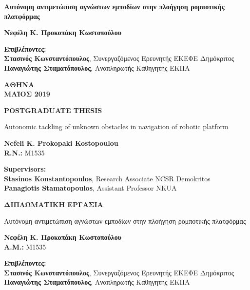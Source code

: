 \begin{center}
	\vspace{1.5cm}
	\Large
	\textbf{Αυτόνομη αντιμετώπιση αγνώστων εμποδίων στην πλοήγηση ρομποτικής πλατφόρμας}
	
	\vspace{1.5cm}
	\normalsize
	\textbf{Νεφέλη Κ. Προκοπάκη Κωστοπούλου}
	
	\vspace{1.5cm}
	\textbf{Επιβλέποντες:}\\
	\textbf{Στασινός Κωνσταντόπουλος}, Συνεργαζόμενος Ερευνητής ΕΚΕΦΕ Δημόκριτος\\
	\textbf{Παναγιώτης Σταματόπουλος}, Αναπληρωτής Καθηγητής ΕΚΠΑ
	
	\vfill
	
	\vspace{0.8cm}
	\textbf{ΑΘΗΝΑ}\\
	\vspace{0.2cm}
	\textbf{ΜΑΪΟΣ 2019}
	\newpage
	
	
	\thispagestyle{empty}
	\normalsize
	
	\vspace{1.5cm}
	\textbf{POSTGRADUATE THESIS}
	
	\vspace{1.5cm}
	Autonomic tackling of unknown obstacles in navigation of robotic platform
	
	\vspace{1.5cm}
	\textbf{Nefeli K. Prokopaki Kostopoulou}\\
	\textbf{R.N.: } M1535
			
	\vspace{1.5cm}
	\textbf{Supervisors:}\\
	\textbf{Stasinos Konstantopoulos}, Research Associate NCSR Demokritos\\
	\textbf{Panagiotis Stamatopoulos}, Assistant Professor NKUA
	\newpage
	
	
	\thispagestyle{empty}
			
	\vspace{1.5cm}
	\textbf{ΔΙΠΛΩΜΑΤΙΚΗ ΕΡΓΑΣΙΑ}
	
	\vspace{1.5cm}
	Αυτόνομη αντιμετώπιση αγνώστων εμποδίων στην πλοήγηση ρομποτικής πλατφόρμας
	
	\vspace{1.5cm}
	\textbf{Νεφέλη Κ. Προκοπάκη Κωστοπούλου}\\
	\textbf{Α.Μ.: } Μ1535
	
	\vspace{1.5cm}
	\textbf{Επιβλέποντες:}\\
	\textbf{Στασινός Κωνσταντόπουλος}, Συνεργαζόμενος Ερευνητής ΕΚΕΦΕ Δημόκριτος\\
	\textbf{Παναγιώτης Σταματόπουλος}, Αναπληρωτής Καθηγητής ΕΚΠΑ
\end{center}
